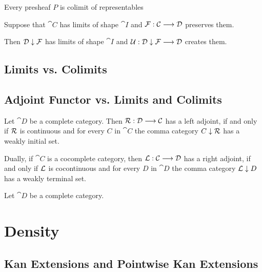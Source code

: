 	\begin{theorem}
		Every presheaf $P$ is colimit of representables
	\end{theorem}

	\begin{proposition}
		Suppose that $\cat{C}$ has limits of shape $\cat{I}$ and $\mathcal{F}:\mathcal{C} --> \mathcal{D}$ preserves them.

		Then $\mathcal{D} \downarrow \mathcal{F}$ has limits of shape $\cat{I}$ and $\mathcal{U}: \mathcal{D} \downarrow \mathcal{F} --> \mathcal{D}$ creates them.
	\end{proposition}

	\subsection{Limits vs. Colimits}
	\subsection{Adjoint Functor vs. Limits and Colimits}

	\begin{proposition}
	\end{proposition}

	\begin{theorem}
		Let $\cat{D}$ be a complete category. Then $\mathcal{R}: \mathcal{D} --> \mathcal{C}$ has a left adjoint, if and only if $\mathcal{R}$ is continuous and for every $C$ in $\cat{C}$ the comma category $C \downarrow \mathcal{R}$ has a weakly initial set.

		Dually, if $\cat{C}$ is a cocomplete category, then $\mathcal{L}: \mathcal{C} --> \mathcal{D}$ has a right adjoint, if and only if $\mathcal{L}$ is cocontinuous and for every $D$ in $\cat{D}$ the comma category $\mathcal{L} \downarrow D$ has a weakly terminal set.
	\end{theorem}

	\begin{theorem}
		Let $\cat{D}$ be a complete category. 
	\end{theorem}

	\section{Density}
	\subsection{Kan Extensions and Pointwise Kan Extensions}

